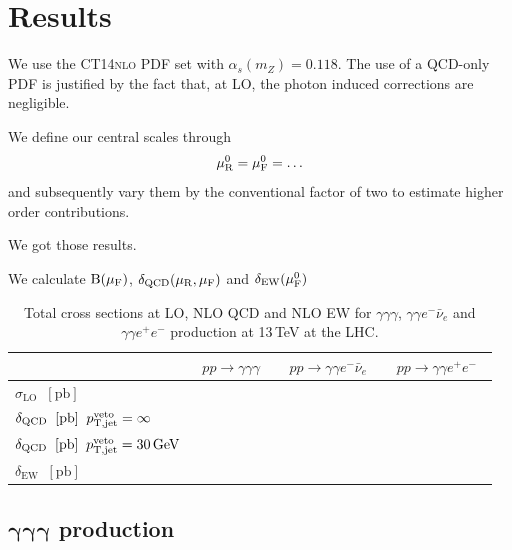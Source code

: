 \section{Results}
\label{sec:results}

We use the \textsc{CT14nlo} PDF set with $\alpha_s(m_Z)=0.118$. 
The use of a QCD-only PDF is justified by the fact that, 
at LO, the photon induced corrections are negligible.

We define our central scales through
\begin{equation}
  \label{eq:murfdef}
  \begin{split}
    \mu_{\mathrm{R}}^0 = \mu_{\mathrm{F}}^0 = \ldots
  \end{split}
\end{equation}
and subsequently vary them by the conventional factor 
of two to estimate higher order contributions.


We got those results.

We calculate $\mathrm{B}(\mu_{\mathrm{F}})$, $\delta_\text{QCD}(\mu_{\mathrm{R}},\mu_{\mathrm{F}})$ and 
$\delta_\text{EW}(\mu_{\mathrm{F}}^0)$

\begin{table}[h!]
  \centering
  \begin{tabular}{l||c|c|c}
      & $\;\;pp \to \gamma \gamma\gamma\;\;$
      & $\;\;pp \to \gamma \gamma e^-\bar\nu_e\;\;$ 
      & $\;\;pp \to \gamma \gamma e^+e^-\;\;$ \\
    \hline\hline
    $\sigma_\text{LO}\;\;[\text{pb}] $ &  &  & \\
    \hline
    $\delta_\text{QCD}\;\;[\text{pb}]\;\;p_\text{T,jet}^\text{veto}=\infty $ &  &  & \\
    \hline
    $\delta_\text{QCD}\;\;[\text{pb}]\;\;p_\text{T,jet}^\text{veto}=30\,\text{GeV} $ &  &  & \\
    \hline
    $\delta_\text{EW}\;\;[\text{pb}] $ &  &  & \\
  \end{tabular}
  \caption{
    Total cross sections at LO, NLO QCD and NLO EW for $\gamma\gamma\gamma$, 
    $\gamma\gamma e^-\bar\nu_e$ and $\gamma\gamma e^+e^-$
    production at 13\,TeV at the LHC.
    \label{tab:xsec}
  } 
\end{table}


\subsection{\texorpdfstring{$\boldsymbol{\gamma\gamma\gamma}$}{aaa} production}
\label{sec:results:aaa}


